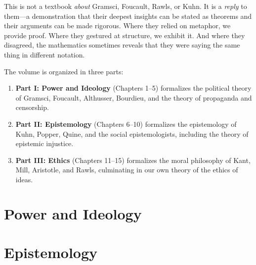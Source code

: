 \documentclass[11pt,oneside]{book}
\theoremstyle{plain}
\theoremstyle{definition}
\theoremstyle{remark}
\begin{document}
This is not a textbook \emph{about} Gramsci, Foucault, Rawls, or Kuhn. It is a
\emph{reply} to them---a demonstration that their deepest insights can be stated
as theorems and their arguments can be made rigorous. Where they relied on
metaphor, we provide proof. Where they gestured at structure, we exhibit it.
And where they disagreed, the mathematics sometimes reveals that they were
saying the same thing in different notation.

\vspace{1em}

The volume is organized in three parts:

\begin{enumerate}
\item \textbf{Part I: Power and Ideology} (Chapters 1--5) formalizes the
political theory of Gramsci, Foucault, Althusser, Bourdieu, and the theory
of propaganda and censorship.

\item \textbf{Part II: Epistemology} (Chapters 6--10) formalizes the
epistemology of Kuhn, Popper, Quine, and the social epistemologists,
including the theory of epistemic injustice.

\item \textbf{Part III: Ethics} (Chapters 11--15) formalizes the moral
philosophy of Kant, Mill, Aristotle, and Rawls, culminating in our own
theory of the ethics of ideas.
\end{enumerate}

\tableofcontents

\mainmatter

\part{Power and Ideology}



\part{Epistemology}



\end{document}
